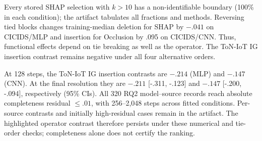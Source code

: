 Every stored SHAP selection with $k>10$ has a non-identifiable boundary
(100\% in each condition); the artifact tabulates all fractions and methods.
Reversing tied blocks changes training-median deletion for SHAP by $-.041$
on CICIDS/MLP and insertion for Occlusion by .095 on CICIDS/CNN. Thus,
functional effects depend on tie breaking as well as the operator. The
ToN-IoT IG insertion contrast remains negative under all four alternative orders.

At 128 steps, the ToN-IoT IG insertion contrasts are $-.214$ (MLP) and
$-.147$ (CNN). At the final resolution they are $-.211$ [-.311, -.123] and $-.147$ [-.200, -.094], respectively (95\% CIs).
All 320 RQ2 model--source records reach absolute completeness residual
$\leq .01$, with 256--2,048 steps across fitted conditions. Per-source
contrasts and initially high-residual cases remain in the artifact.
The highlighted operator contrast therefore persists under these numerical
and tie-order checks; completeness alone does not certify the ranking.

